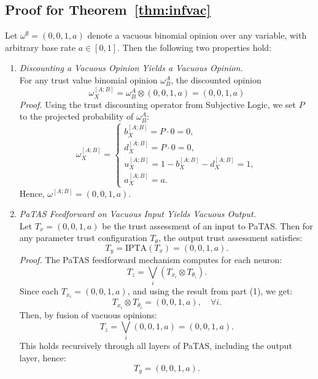 \subsection{Proof for Theorem~\ref{thm:infvac}}

Let \( \omega^\emptyset = (0, 0, 1, a) \) denote a vacuous binomial opinion over any variable, with arbitrary base rate \( a \in [0, 1] \). Then the following two properties hold:

\begin{enumerate}
    \item \emph{Discounting a Vacuous Opinion Yields a Vacuous Opinion.} \\
    For any trust value binomial opinion \(\omega^A_B \), the discounted opinion
    \[
    \omega^{[A;B]}_X = \omega^A_B \otimes (0,0,1,a)= (0,0,1,a)
    \]
    \textit{Proof.} Using the trust discounting operator from Subjective Logic, we set $P$ to the projected probability of \(\omega^A_B\):
    \[\omega^{[A;B]}_X = 
    \begin{cases}
    b^{[A;B]}_X = P\cdot 0 = 0, \\
    d^{[A;B]}_X = P\cdot 0 = 0, \\
    u^{[A;B]}_X = 1 - b^{[A;B]}_X-d^{[A;B]}_X = 1, \\
    a^{[A;B]}_X = a.
    \end{cases}
    \]
    Hence, \( \omega^{[A;B]} = (0,0,1,a) \).

    \item \emph{PaTAS Feedforward on Vacuous Input Yields Vacuous Output.} \\
    Let \( T_x = (0,0,1,a)\) be the trust assessment of an input to PaTAS. Then for any parameter trust configuration \( T_\theta \), the output trust assessment satisfies:
    \[
    T_y = \text{IPTA}(T_x) = (0,0,1,a).
    \]
    \textit{Proof.} The PaTAS feedforward mechanism computes for each neuron:
    \[
    T_z = \bigvee_i \left( T_{x_i} \otimes T_{\theta_i} \right).
    \]
    Since each \( T_{x_i} = (0,0,1,a) \), and using the result from part (1), we get:
    \[
    T_{x_i} \otimes T_{\theta_i} = (0,0,1,a), \quad \forall i.
    \]
    Then, by fusion of vacuous opinions:
    \[
    T_z = \bigvee_i (0,0,1,a) = (0,0,1,a).
    \]
    This holds recursively through all layers of PaTAS, including the output layer, hence:
    \[
    T_y = (0,0,1,a).
    \]
\end{enumerate}

